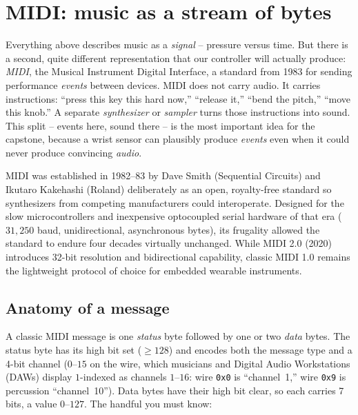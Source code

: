 \section{MIDI: music as a stream of bytes}
\label{ch29:midi}

Everything above describes music as a \emph{signal} -- pressure versus time. But there is a second,
quite different representation that our controller will actually produce: \emph{MIDI}, the Musical
Instrument Digital Interface, a standard from 1983 for sending performance \emph{events} between
devices. MIDI does not carry audio. It carries instructions: ``press this key this hard now,''
``release it,'' ``bend the pitch,'' ``move this knob.'' A separate \emph{synthesizer} or
\emph{sampler} turns those instructions into sound. This split -- events here, sound there -- is the
most important idea for the capstone, because a wrist sensor can plausibly produce
\emph{events} even when it could never produce convincing \emph{audio}.

\begin{applicationbox}
MIDI was established in 1982--83 by Dave Smith (Sequential Circuits) and Ikutaro Kakehashi (Roland)
deliberately as an open, royalty-free standard so synthesizers from competing manufacturers could
interoperate. Designed for the slow microcontrollers and inexpensive optocoupled serial hardware
of that era ($31{,}250$ baud, unidirectional, asynchronous bytes), its frugality allowed the
standard to endure four decades virtually unchanged. While MIDI 2.0 (2020) introduces
32-bit resolution and bidirectional capability,
classic MIDI 1.0 remains the lightweight protocol of choice for embedded wearable instruments.
\end{applicationbox}

\subsection*{Anatomy of a message}

A classic MIDI message is one \emph{status} byte followed by one or two \emph{data} bytes. The status
byte has its high bit set ($\ge 128$) and encodes both the message type and a 4-bit channel ($0$--$15$ on the wire, which musicians and Digital Audio Workstations (DAWs) display $1$-indexed as channels $1$--$16$: wire \texttt{0x0} is ``channel~1,'' wire \texttt{0x9} is percussion ``channel~10''). Data bytes have their high bit clear, so each carries 7 bits, a
value $0$--$127$. The handful you must know:

